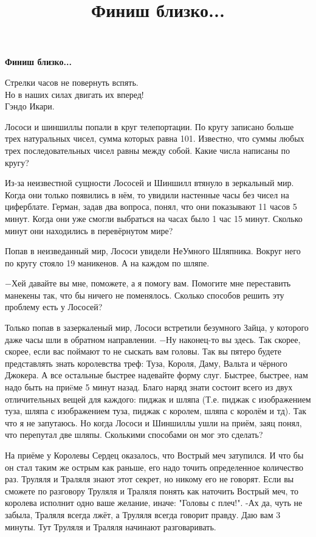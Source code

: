 \centerline{\bf \Huge Финиш близко...}
\title{Финиш близко...}

\begin{flushright}
    \scriptsize Стрелки часов не повернуть вспять.\\ Но в наших силах двигать их вперед!\\Гэндо Икари.
\end{flushright}

Лососи и шиншиллы попали в круг телепортации. По кругу записано больше трех натуральных чисел, сумма которых равна 101. Известно, что суммы любых трех последовательных чисел равны между собой. Какие числа написаны по кругу?


Из-за неизвестной сущности Лососей и Шиншилл втянуло в зеркальный мир. Когда они только появились в нём, то увидили настенные часы без чисел на циферблате. Герман, задав два вопроса, понял, что они показывают 11 часов 5 минут. Когда они уже смогли выбраться на часах было 1 час 15 минут. Сколько минут они находились в перевёрнутом мире?


Попав в неизведанный мир, Лососи увидели НеУмного Шляпника. Вокруг него по кругу стояло 19 маникенов. А на каждом по шляпе.

$-$Хей давайте вы мне, поможете, а я помогу вам. Помогите мне переставить манекены так, что бы ничего не поменялось. Сколько способов решить эту проблему есть у Лососей? 

Только попав в зазеркаленый мир, Лососи встретили безумного Зайца, у которого даже часы шли в обратном направлении.
$-$Ну наконец-то вы здесь. Так скорее, скорее, если вас поймают то не сыскать вам головы. Так вы пятеро будете представлять знать королевства треф: Туза, Короля, Даму, Вальта и чёрного Джокера. А все остальные быстрее надевайте форму слуг. Быстрее, быстрее, нам надо быть на приëме 5 минут назад. Благо наряд знати состоит всего из двух отличительных вещей для каждого: пиджак и шляпа
(Т.е. пиджак с изображением туза, шляпа с изображением туза, пиджак с королем, шляпа с королём и тд). Так что я не запутаюсь.
Но когда Лососи и Шиншиллы ушли на приём, заяц понял, что перепутал две шляпы.
Сколькими способами он мог это сделать? 


\newpage

На приёме у Королевы Сердец оказалось, что Вострый меч затупился. И что бы он стал таким же острым как раньше, его надо точить определенное количество раз. Труляля и Траляля знают этот секрет, но никому его не говорят. Если вы сможете по разговору Труляля и Траляля понять как наточить Вострый меч, то королева исполнит одно ваше желание, иначе: "Головы с плеч!".
-Ах да, чуть не забыла, Траляля всегда лжёт, а Труляля всегда говорит правду. Даю вам 3 минуты.
Тут Труляля и Траляля начинают разговаривать.

